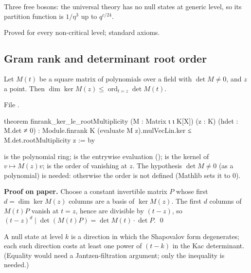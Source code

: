 \begin{physics}
Three free bosons: the universal theory has no null states at generic level, so its partition function is
$1/\eta^3$ up to $q^{c/24}$.
\end{physics}

\begin{status}
Proved for every non-critical level; standard axioms.
\end{status}

\subsection{Gram rank and determinant root order}

\begin{lemma}\label{l20:lem:rootorder}
Let $M(t)$ be a square matrix of polynomials over a field with $\det M\neq0$, and $z$ a point. Then
$\dim\ker M(z)\le\operatorname{ord}_{t=z}\det M(t)$.
\end{lemma}
\noindent File .
\begin{leancode}
theorem finrank_ker_le_rootMultiplicity (M : Matrix ι ι K[X]) (z : K)
    (hdet : M.det ≠ 0) :
    Module.finrank K (evaluate M z).mulVecLin.ker ≤ M.det.rootMultiplicity z := by
\end{leancode}

\begin{dictionary}
 is the polynomial ring;  is the entrywise evaluation ();
 is the kernel of $v\mapsto M(z)v$;  is the order of vanishing at $z$. The
hypothesis $\det M\neq0$ (as a polynomial) is needed: otherwise the order is not defined (Mathlib sets it to $0$).
\end{dictionary}

\textbf{Proof on paper.} Choose a constant invertible matrix $P$ whose first $d=\dim\ker M(z)$ columns are a basis of
$\ker M(z)$. The first $d$ columns of $M(t)P$ vanish at $t=z$, hence are divisible by $(t-z)$, so
$(t-z)^d\mid\det(M(t)P)=\det M(t)\cdot\det P$. \qed

\begin{physics}
A null state at level $k$ is a direction in which the Shapovalov form degenerates; each such direction costs at least
one power of $(t-k)$ in the Kac determinant. (Equality would need a Jantzen-filtration argument; only the inequality is
needed.)
\end{physics}

